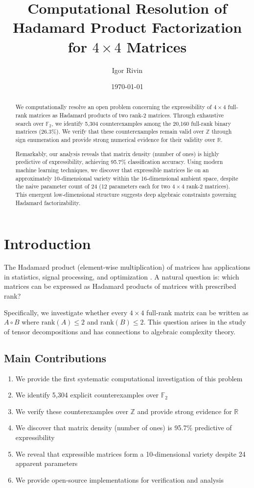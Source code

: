 \documentclass[11pt]{amsart}
\title{Computational Resolution of Hadamard Product Factorization for $4 \times 4$ Matrices}
\author{Igor Rivin}\thanks{with computational assistance from Claude}
\date{\today}
\theoremstyle{plain}
\theoremstyle{definition}
\theoremstyle{remark}
\begin{document}
\begin{abstract}
We computationally resolve an open problem concerning the expressibility of $4 \times 4$ full-rank matrices as Hadamard products of two rank-2 matrices. Through exhaustive search over $\mathbb{F}_2$, we identify 5,304 counterexamples among the 20,160 full-rank binary matrices (26.3\%). We verify that these counterexamples remain valid over $\mathbb{Z}$ through sign enumeration and provide strong numerical evidence for their validity over $\mathbb{R}$. 

Remarkably, our analysis reveals that matrix density (number of ones) is highly predictive of expressibility, achieving 95.7\% classification accuracy. Using modern machine learning techniques, we discover that expressible matrices lie on an approximately 10-dimensional variety within the 16-dimensional ambient space, despite the naive parameter count of 24 (12 parameters each for two $4 \times 4$ rank-2 matrices). This emergent low-dimensional structure suggests deep algebraic constraints governing Hadamard factorizability.
\end{abstract}
\maketitle

\section{Introduction}

The Hadamard product (element-wise multiplication) of matrices has applications in statistics, signal processing, and optimization \cite{horn1990hadamard,styan1973hadamard}. A natural question is: which matrices can be expressed as Hadamard products of matrices with prescribed rank?

Specifically, we investigate whether every $4 \times 4$ full-rank matrix can be written as $A \circ B$ where $\mathrm{rank}(A) \leq 2$ and $\mathrm{rank}(B) \leq 2$. This question arises in the study of tensor decompositions and has connections to algebraic complexity theory.

\subsection{Main Contributions}

\begin{enumerate}
\item We provide the first systematic computational investigation of this problem
\item We identify 5,304 explicit counterexamples over $\mathbb{F}_2$
\item We verify these counterexamples over $\mathbb{Z}$ and provide strong evidence for $\mathbb{R}$
\item We discover that matrix density (number of ones) is 95.7\% predictive of expressibility
\item We reveal that expressible matrices form a 10-dimensional variety despite 24 apparent parameters
\item We provide open-source implementations for verification and analysis
\end{enumerate}
\end{document}
